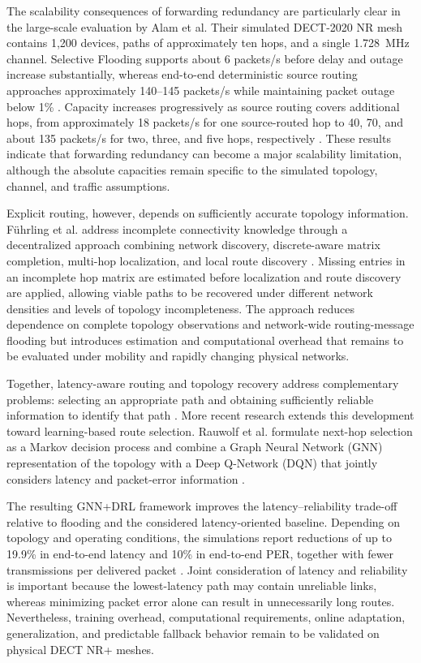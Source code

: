 The scalability consequences of forwarding redundancy are particularly clear
in the large-scale evaluation by Alam et al. Their simulated DECT-2020 NR mesh
contains 1,200 devices, paths of approximately ten hops, and a single
1.728~MHz channel. Selective Flooding supports about 6 packets/s before delay
and outage increase substantially, whereas end-to-end deterministic source
routing approaches approximately 140--145 packets/s while maintaining packet
outage below 1\%
\cite{alamDLRoutingPerformance2026a}. Capacity increases progressively as
source routing covers additional hops, from approximately 18 packets/s for
one source-routed hop to 40, 70, and about 135 packets/s for two, three, and
five hops, respectively
\cite{alamDLRoutingPerformance2026a}. These results indicate that forwarding
redundancy can become a major scalability limitation, although the absolute
capacities remain specific to the simulated topology, channel, and traffic
assumptions.

Explicit routing, however, depends on sufficiently accurate topology
information. F{\"u}hrling et al. address incomplete connectivity knowledge
through a decentralized approach combining network discovery, discrete-aware
matrix completion, multi-hop localization, and local route discovery
\cite{fuhrlingRobustRoutingProtocol2025b}. Missing entries in an incomplete
hop matrix are estimated before localization and route discovery are applied,
allowing viable paths to be recovered under different network densities and
levels of topology incompleteness. The approach reduces dependence on
complete topology observations and network-wide routing-message flooding but
introduces estimation and computational overhead that remains to be evaluated
under mobility and rapidly changing physical networks.

Together, latency-aware routing and topology recovery address complementary
problems: selecting an appropriate path and obtaining sufficiently reliable
information to identify that path
\cite{asifURLLCBasedMultiHopCommunication2025,
fuhrlingRobustRoutingProtocol2025b}. More recent research extends this
development toward learning-based route selection. Rauwolf et al. formulate
next-hop selection as a Markov decision process and combine a Graph Neural
Network (GNN) representation of the topology with a Deep Q-Network (DQN) that
jointly considers latency and packet-error information
\cite{rauwolfTopologyAwareDeepReinforcement2026a}.

The resulting GNN+DRL framework improves the latency--reliability trade-off
relative to flooding and the considered latency-oriented baseline. Depending
on topology and operating conditions, the simulations report reductions of up
to 19.9\% in end-to-end latency and 10\% in end-to-end PER, together with
fewer transmissions per delivered packet
\cite{rauwolfTopologyAwareDeepReinforcement2026a}. Joint consideration of
latency and reliability is important because the lowest-latency path may
contain unreliable links, whereas minimizing packet error alone can result in
unnecessarily long routes. Nevertheless, training overhead, computational
requirements, online adaptation, generalization, and predictable fallback
behavior remain to be validated on physical DECT NR+ meshes.

